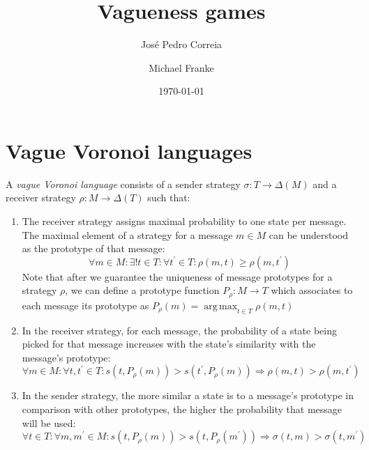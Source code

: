 \documentclass{article}
\title{Vagueness games}
\author{José Pedro Correia \and Michael Franke}
\date{\today}
\DeclareMathOperator*{\argmax}{arg\,max}
\begin{document}
\maketitle

\section{Vague Voronoi languages}

A \emph{vague Voronoi language} consists of a sender strategy $\sigma:T\rightarrow\Delta\left(M\right)$ and a receiver strategy $\rho:M\rightarrow \Delta\left(T\right)$ such that:

\begin{enumerate}
\item The receiver strategy assigns maximal probability to one state per message. The maximal element of a strategy for a message $m\in M$ can be understood as the prototype of that message:
\begin{equation}
\forall m\in M:\exists!t\in T:\forall t^{\prime}\in T:\rho\left(m,t\right)\geq\rho\left(m,t^{\prime}\right)
\end{equation}
Note that after we guarantee the uniqueness of message prototypes for a strategy $\rho$, we can define a prototype function $P_{\rho}:M\rightarrow T$
which associates to each message its prototype as $P_{\rho}\left(m\right)=\argmax_{t\in T}\rho\left(m,t\right)$

\item In the receiver strategy, for each message, the probability of a state being picked for that message increases with the state's similarity with the message's prototype:
\begin{equation}
\forall m\in M:\forall t,t^{\prime}\in T:s\left(t,P_{\rho}\left(m\right)\right)>s\left(t^{\prime},P_{\rho}\left(m\right)\right)\Rightarrow\rho\left(m,t\right)>\rho\left(m,t^{\prime}\right)
\end{equation}

\item In the sender strategy, the more similar a state is to a message's prototype in comparison with other prototypes, the higher the probability that message will be used:
\begin{equation}
\forall t\in T:\forall m,m^{\prime}\in M:s\left(t,P_{\rho}\left(m\right)\right)>s\left(t,P_{\rho}\left(m^{\prime}\right)\right)\Rightarrow\sigma\left(t,m\right)>\sigma\left(t,m^{\prime}\right)
\end{equation}
\end{enumerate}
\end{document}
